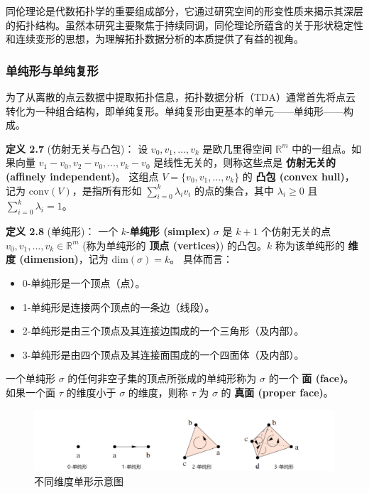 同伦理论是代数拓扑学的重要组成部分，它通过研究空间的形变性质来揭示其深层的拓扑结构。虽然本研究主要聚焦于持续同调，同伦理论所蕴含的关于形状稳定性和连续变形的思想，为理解拓扑数据分析的本质提供了有益的视角。

\subsubsection{单纯形与单纯复形}
为了从离散的点云数据中提取拓扑信息，拓扑数据分析（TDA）通常首先将点云转化为一种组合结构，即单纯复形。单纯复形由更基本的单元——单纯形——构成。

\textbf{定义 2.7} (仿射无关与凸包)\cite{zomorodian2004computing}：
设 $v_0, v_1, \ldots, v_k$ 是欧几里得空间 $\mathbb{R}^m$ 中的一组点。如果向量 $v_1-v_0, v_2-v_0, \ldots, v_k-v_0$ 是线性无关的，则称这些点是 \textbf{仿射无关的 (affinely independent)}。
这组点 $V = \{v_0, v_1, \ldots, v_k\}$ 的 \textbf{凸包 (convex hull)}，记为 $\text{conv}(V)$，是指所有形如 $\sum_{i=0}^k \lambda_i v_i$ 的点的集合，其中 $\lambda_i \ge 0$ 且 $\sum_{i=0}^k \lambda_i = 1$。

\textbf{定义 2.8} (单纯形)\cite{zomorodian2004computing}：
一个 $k$-\textbf{单纯形 (simplex)} $\sigma$ 是 $k+1$ 个仿射无关的点 $v_0, v_1, \ldots, v_k \in \mathbb{R}^m$ (称为单纯形的 \textbf{顶点 (vertices)}) 的凸包。$k$ 称为该单纯形的 \textbf{维度 (dimension)}，记为 $\text{dim}(\sigma) = k$。
具体而言：
\begin{itemize}
    \item 0-单纯形是一个顶点（点）。
    \item 1-单纯形是连接两个顶点的一条边（线段）。
    \item 2-单纯形是由三个顶点及其连接边围成的一个三角形（及内部）。
    \item 3-单纯形是由四个顶点及其连接面围成的一个四面体（及内部）。
\end{itemize}
一个单纯形 $\sigma$ 的任何非空子集的顶点所张成的单纯形称为 $\sigma$ 的一个 \textbf{面 (face)}。如果一个面 $\tau$ 的维度小于 $\sigma$ 的维度，则称 $\tau$ 为 $\sigma$ 的 \textbf{真面 (proper face)}。
\begin{figure}[thbp!]
    \centering
    \includegraphics[width=1.1\textwidth]{figure/单纯形.png}
    \caption{不同维度单形示意图}
\end{figure}

